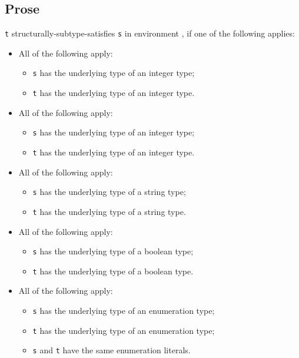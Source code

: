 \documentclass{book}
\begin{document}
\subsection{Prose}
\texttt{t} structurally-subtype-satisfies \texttt{s} in environment \tenv, if one of the following applies:
  \begin{itemize}
  \item All of the following apply:
    \begin{itemize}
    \item \texttt{s} has the underlying type of an integer type;
    \item \texttt{t} has the underlying type of an integer type.
    \end{itemize}

  \item All of the following apply:
    \begin{itemize}
    \item \texttt{s} has the underlying type of an integer type;
    \item \texttt{t} has the underlying type of an integer type.
    \end{itemize}

  \item All of the following apply:
    \begin{itemize}
    \item \texttt{s} has the underlying type of a string type;
    \item \texttt{t} has the underlying type of a string type.
    \end{itemize}

  \item All of the following apply:
    \begin{itemize}
    \item \texttt{s} has the underlying type of a boolean type;
    \item \texttt{t} has the underlying type of a boolean type.
    \end{itemize}

  \item All of the following apply:
    \begin{itemize}
    \item \texttt{s} has the underlying type of an enumeration type;
    \item \texttt{t} has the underlying type of an enumeration type;
    \item \texttt{s} and \texttt{t} have the same enumeration literals.
   \end{itemize}


\end{itemize}
\end{document}
